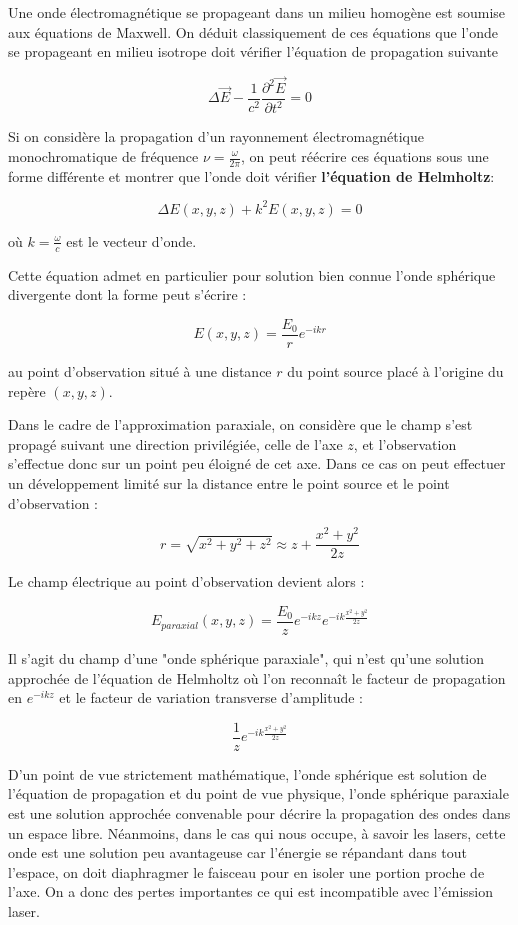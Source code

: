 \documentclass{book}
\begin{document}
Une onde électromagnétique se propageant dans un milieu homogène est soumise aux équations de Maxwell. On déduit classiquement de ces équations que l'onde se propageant en milieu isotrope doit vérifier l'équation de propagation suivante

$$\Delta \overrightarrow E-\frac 1{c^2}\frac{\partial ^2 \overrightarrow E}{\partial
            t^2}=0$$

Si on considère la propagation d'un rayonnement électromagnétique monochromatique de fréquence $\nu = \frac
            \omega {2\pi}$, on peut réécrire ces équations sous une forme différente et montrer que l'onde doit vérifier \textbf{\color{red}l'équation de Helmholtz}:
            
            $$\Delta
            E(x, y, z) + k^2E(x, y, z) = 0$$
            
où $k=\frac \omega c$ est le vecteur d'onde.

Cette équation admet en particulier pour solution bien connue l'onde sphérique divergente dont la forme peut s'écrire :

$$E(x, y, z) = \frac {E_0} r e^{-ikr}$$

au point d'observation situé à une distance $r$ du point source placé à l'origine du repère $(x,y,z)$.

Dans le cadre de l'approximation paraxiale, on considère que le champ s'est propagé suivant une direction privilégiée, celle de l'axe $z$, et l'observation s'effectue donc sur un point peu éloigné de cet axe. Dans ce cas on peut effectuer un développement limité sur la distance entre le point source et le point d'observation :

$$r=\sqrt{x^2+y^2+z^2}\approx z + \frac {x^2 + y^2}{2z}$$

Le champ électrique au point d'observation devient alors :

$$E_{paraxial}(x, y, z) = \frac {E_0} z e^{-ikz}e^{-ik \frac {x^2 + y^2}{2z}}$$

Il s'agit du champ d'une "onde sphérique paraxiale", qui n'est qu'une solution approchée de l'équation de Helmholtz où l'on reconnaît le facteur de propagation en $e^{-ikz}$ et le facteur de variation transverse d'amplitude :

$$\frac 1 z e^{-ik \frac {x^2 + y^2}{2z}}$$

D'un point de vue strictement mathématique, l'onde sphérique est solution de l'équation de propagation et du point de vue physique, l'onde sphérique paraxiale est une solution approchée convenable pour décrire la propagation des ondes dans un espace libre. Néanmoins, dans le cas qui nous occupe, à savoir les lasers, cette onde est une solution peu avantageuse car l'énergie se répandant dans tout l'espace, on doit diaphragmer le faisceau pour en isoler une portion proche de l'axe. On a donc des pertes importantes ce qui est incompatible avec l'émission laser.
\end{document}
